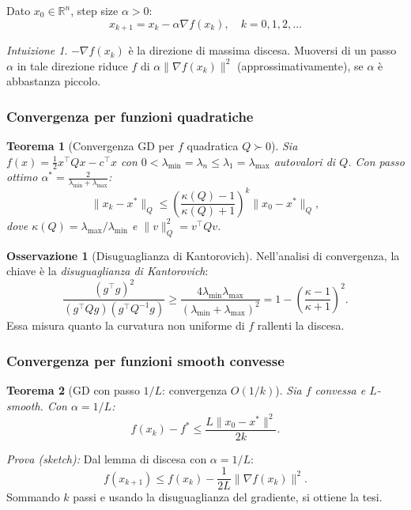 \documentclass[11pt, a4paper, twoside]{book}
\theoremstyle{definition}
\newtheorem{remark}{Osservazione}[chapter]
\theoremstyle{plain}
\newtheorem{thm}{Teorema}[chapter]
\theoremstyle{remark}
\newtheorem{intuition}{Intuizione}[chapter]
\newcommand{\R}{\mathbb{R}}
\begin{document}
\begin{algobox}
Dato $x_0 \in \R^n$, step size $\alpha > 0$:
\[
  x_{k+1} = x_k - \alpha \nabla f(x_k), \quad k = 0, 1, 2, \ldots
\]
\end{algobox}

\begin{intuition}
$-\nabla f(x_k)$ è la direzione di massima discesa. Muoversi di un passo $\alpha$ in tale direzione riduce $f$ di $\alpha \|\nabla f(x_k)\|^2$ (approssimativamente), se $\alpha$ è abbastanza piccolo.
\end{intuition}

\subsubsection{Convergenza per funzioni quadratiche}

\begin{thm}[Convergenza GD per $f$ quadratica $Q \succ 0$]
Sia $f(x) = \frac{1}{2}x^\top Q x - c^\top x$ con $0 < \lambda_{\min} = \lambda_n \leq \lambda_1 = \lambda_{\max}$ autovalori di $Q$. Con passo ottimo $\alpha^* = \frac{2}{\lambda_{\min} + \lambda_{\max}}$:
\[
  \|x_k - x^*\|_Q \leq \left(\frac{\kappa(Q) - 1}{\kappa(Q) + 1}\right)^k \|x_0 - x^*\|_Q,
\]
dove $\kappa(Q) = \lambda_{\max}/\lambda_{\min}$ e $\|v\|_Q^2 = v^\top Q v$.
\end{thm}

\begin{remark}[Disuguaglianza di Kantorovich]
Nell'analisi di convergenza, la chiave è la \emph{disuguaglianza di Kantorovich}:
\[
  \frac{(g^\top g)^2}{(g^\top Qg)(g^\top Q^{-1}g)} \geq \frac{4\lambda_{\min}\lambda_{\max}}{(\lambda_{\min}+\lambda_{\max})^2} = 1 - \left(\frac{\kappa-1}{\kappa+1}\right)^2.
\]
Essa misura quanto la curvatura non uniforme di $f$ rallenti la discesa.
\end{remark}

\subsubsection{Convergenza per funzioni smooth convesse}

\begin{thm}[GD con passo $1/L$: convergenza $O(1/k)$]
Sia $f$ convessa e $L$-smooth. Con $\alpha = 1/L$:
\[
  f(x_k) - f^* \leq \frac{L\|x_0 - x^*\|^2}{2k}.
\]
\end{thm}

\textit{Prova (sketch):} Dal lemma di discesa con $\alpha = 1/L$:
\[
  f(x_{k+1}) \leq f(x_k) - \frac{1}{2L}\|\nabla f(x_k)\|^2.
\]
Sommando $k$ passi e usando la disuguaglianza del gradiente, si ottiene la tesi.
\end{document}

